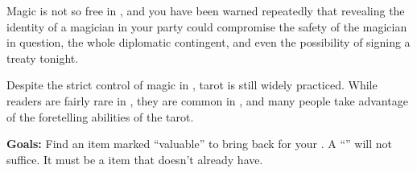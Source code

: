 \documentclass[blue]{NeptuneBall}
\begin{document}
\begin{itemize}
  Magic is not so free in \pAtlantis{}, and you have been warned repeatedly that revealing the identity of a magician in your party could compromise the safety of the magician in question, the whole diplomatic contingent, and even the possibility of signing a treaty tonight.
  
  Despite the strict control of magic in \pAtlantis{}, tarot is still widely practiced. While readers are fairly rare in \pPacifica{}, they are common in \pAtlantis{}, and many people take advantage of the foretelling abilities of the tarot.
\end{itemize}

{\bf Goals:} Find an item marked ``valuable'' to bring back for your \cPacificanRuler{\King}. A ``\iSignetRing{}'' will not suffice. It must be a item that \cPacificanRuler{\King} \cPacificanRuler{} doesn't already have.
\end{document}
